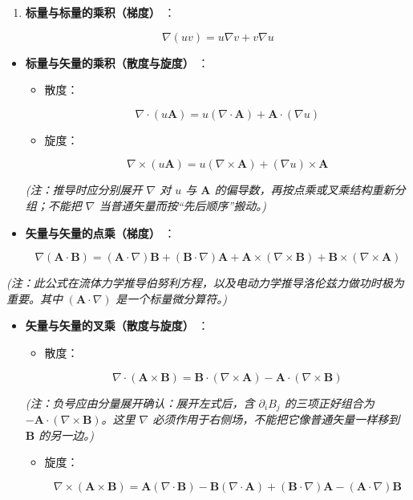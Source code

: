 \begin{enumerate}
\def\labelenumi{\arabic{enumi}.}
\item
  \textbf{标量与标量的乘积（梯度）} ：

  \[
  \nabla (uv) = u\nabla v + v\nabla u
  \]
\end{enumerate}

\begin{itemize}
\item
  \textbf{标量与矢量的乘积（散度与旋度）} ：

  \begin{itemize}
  \item
    散度：

    \[
    \nabla \cdot (u\mathbf{A}) = u(\nabla \cdot \mathbf{A}) + \mathbf{A} \cdot (\nabla u)
    \]
  \item
    旋度：

    \[
    \nabla \times (u\mathbf{A}) = u(\nabla \times \mathbf{A}) + (\nabla u) \times \mathbf{A}
    \]
  \end{itemize}

  \emph{(注：推导时应分别展开 \(\nabla\) 对 \(u\) 与 \(\mathbf A\)
  的偏导数，再按点乘或叉乘结构重新分组；不能把 \(\nabla\)
  当普通矢量而按``先后顺序''搬动。)}
\item
  \textbf{矢量与矢量的点乘（梯度）} ：

  \[
  \nabla (\mathbf{A} \cdot \mathbf{B}) = (\mathbf{A} \cdot \nabla)\mathbf{B} + (\mathbf{B} \cdot \nabla)\mathbf{A} + \mathbf{A} \times (\nabla \times \mathbf{B}) + \mathbf{B} \times (\nabla \times \mathbf{A})
  \]
\end{itemize}

\emph{(注：此公式在流体力学推导伯努利方程，以及电动力学推导洛伦兹力做功时极为重要。其中}
\emph{\((\mathbf{A} \cdot \nabla)\)} \emph{是一个标量微分算符。)}

\begin{itemize}
\item
  \textbf{矢量与矢量的叉乘（散度与旋度）} ：

  \begin{itemize}
  \item
    散度：

    \[
    \nabla \cdot (\mathbf{A} \times \mathbf{B}) = \mathbf{B} \cdot (\nabla \times \mathbf{A}) - \mathbf{A} \cdot (\nabla \times \mathbf{B})
    \]
  \end{itemize}

  \emph{(注：负号应由分量展开确认：展开左式后，含 \(\partial_iB_j\)
  的三项正好组合为 \(-\mathbf A\cdot(\nabla\times\mathbf B)\)。这里
  \(\nabla\) 必须作用于右侧场，不能把它像普通矢量一样移到 \(\mathbf B\)
  的另一边。)}

  \begin{itemize}
  \item
    旋度：

    \[
    \nabla \times (\mathbf{A} \times \mathbf{B}) = \mathbf{A}(\nabla \cdot \mathbf{B}) - \mathbf{B}(\nabla \cdot \mathbf{A}) + (\mathbf{B} \cdot \nabla)\mathbf{A} - (\mathbf{A} \cdot \nabla)\mathbf{B}
    \]
  \end{itemize}
\end{itemize}

